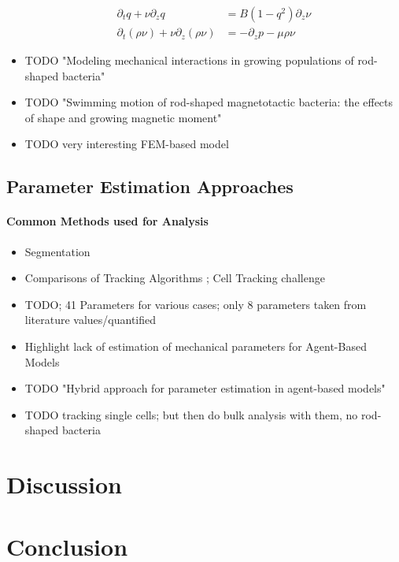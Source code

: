 \documentclass{article}
\begin{document}
\begin{itemize}
\begin{align}
        \partial_t q + \nu \partial_z q &= B(1-q^2) \partial_z \nu\\
        \partial_t(\rho \nu) + \nu \partial_z (\rho \nu) &= - \partial_z p - \mu \rho \nu
    \end{align}
    \item \cite{Pleyer2023} TODO "Modeling mechanical interactions in growing populations of rod-shaped bacteria"
    \item \cite{Kong2014} TODO "Swimming motion of rod-shaped magnetotactic bacteria: the effects of shape and growing magnetic moment"
    \item \cite{Starru} TODO very interesting FEM-based model
\end{itemize}

\subsection{Parameter Estimation Approaches}

\paragraph{Common Methods used for Analysis}
\begin{itemize}
    \item Segmentation \cite{}
    \item Comparisons of Tracking Algorithms \cite{Maka2014,Ulman2017}; Cell Tracking challenge
        \cite{Maka2023}
\end{itemize}

\begin{itemize}
    \item \cite{Storck2014} TODO; 41 Parameters for various cases; only 8 parameters taken from
        literature values/quantified
    \item Highlight lack of estimation of mechanical parameters for Agent-Based Models
    \item \cite{Gallaher2017} TODO "Hybrid approach for parameter estimation in agent-based models"
    \item \cite{Nguyen2024} TODO tracking single cells; but then do bulk analysis with them, no
        rod-shaped bacteria
\end{itemize}

\section{Discussion}
\section{Conclusion}
\end{document}
